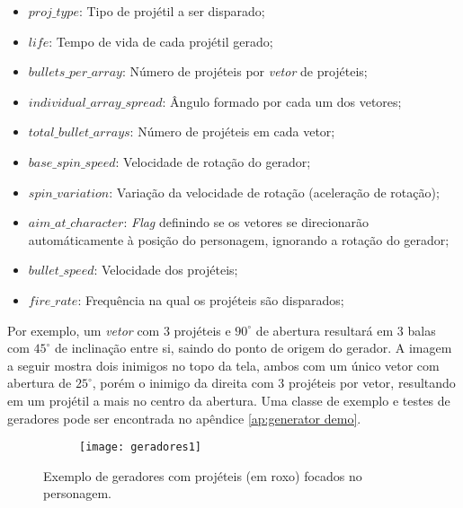 \begin{itemize}
    \item $proj\_type$: Tipo de projétil a ser disparado;
    \item $life$: Tempo de vida de cada projétil gerado;
    \item $bullets\_per\_array$: Número de projéteis por \textit{vetor} de projéteis;
    \item $individual\_array\_spread$: Ângulo formado por cada um dos vetores;
    \item $total\_bullet\_arrays$: Número de projéteis em cada vetor;
    \item $base\_spin\_speed$: Velocidade de rotação do gerador;
    \item $spin\_variation$: Variação da velocidade de rotação (aceleração de rotação);
    \item $aim\_at\_character$: \textit{Flag} definindo se os vetores se direcionarão automáticamente à posição do personagem, ignorando a rotação do gerador;
    \item $bullet\_speed$: Velocidade dos projéteis;
    \item $fire\_rate$: Frequência na qual os projéteis são disparados;
\end{itemize}

Por exemplo, um \textit{vetor} com 3 projéteis e $90^{\circ}$ de abertura resultará em 3 balas com $45^{\circ}$ de inclinação entre si, saindo do ponto de origem do gerador. A imagem a seguir mostra dois inimigos no topo da tela, ambos com um único vetor com abertura de $25^{\circ}$, porém o inimigo da direita com 3 projéteis por vetor, resultando em um projétil a mais no centro da abertura. Uma classe de exemplo e testes de geradores pode ser encontrada no apêndice \ref{ap:generator demo}.

\begin{figure}
    \centering

    \begin{subfigure}{.7\textwidth}
        \centering
        \texttt{[image: geradores1]}
    \end{subfigure}

    \caption{Exemplo de geradores com projéteis (em roxo) focados no personagem.}
\end{figure}


